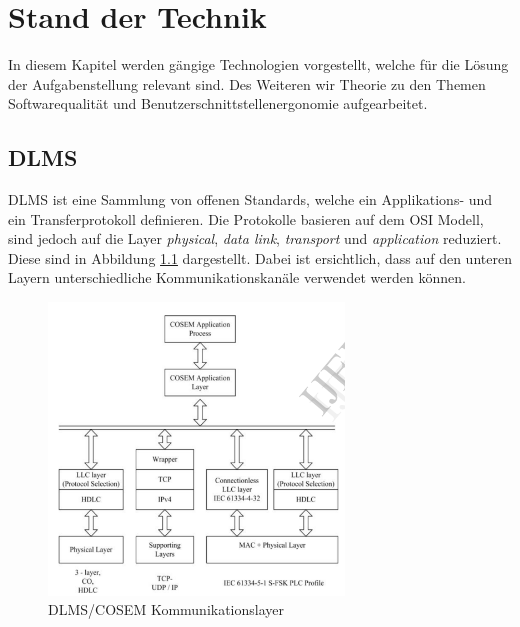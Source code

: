 \chapter{Stand der Technik}
In diesem Kapitel werden gängige Technologien vorgestellt, welche für die Lösung der Aufgabenstellung relevant sind.
Des Weiteren wir Theorie zu den Themen Softwarequalität und Benutzerschnittstellenergonomie aufgearbeitet.


\section{DLMS}
\ac{DLMS} ist eine Sammlung von offenen Standards, welche ein Applikations- und ein Transferprotokoll definieren.
Die Protokolle basieren auf dem \ac{OSI} Modell, sind jedoch auf die Layer \textit{physical}, \textit{data link}, \textit{transport} und \textit{application} reduziert.
Diese sind in Abbildung \ref{fig:dlmsOsi} dargestellt.
Dabei ist ersichtlich, dass auf den unteren Layern unterschiedliche Kommunikationskanäle verwendet werden können.

\begin{figure}[H]
   \centering
   \includegraphics[width=0.7\textwidth]{gfx/Dlms_osi.png}
   \caption{
       DLMS/COSEM Kommunikationslayer
   }
   \label{fig:dlmsOsi}
\end{figure}

